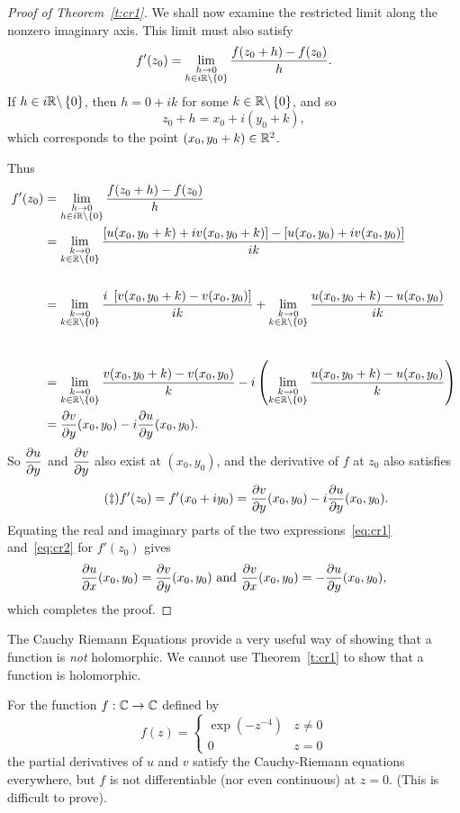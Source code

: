 \begin{proof}[Proof of Theorem~\ref{t:cr1}]
We shall now examine the restricted limit along the nonzero imaginary axis. This limit must also satisfy
\[
f'(z_0) = \displaystyle \lim_{\substack{h\to 0 \\ h \in i \mathbb{R} \backslash \left\{0\right\}}} \frac{f(z_0+h)-f(z_0)}{h}.
\]
If $h \in i \mathbb{R} \backslash \left\{0\right\}$, then $h=0+ik$ for some $k \in \mathbb{R} \backslash \left\{0\right\}$, and so
\[
z_0+h=x_0+i(y_0+k),
\]
which corresponds to the point  $(x_0,y_0+k) \in \mathbb{R}^2$.

Thus
\begin{align*}
f'(z_0) & = \rlim{h \to 0}{h \in i\R \backslash \set{0}} \frac{f(z_0+h)-f(z_0)}{h} \\
& = \rlim{k \to 0}{k \in \R \backslash \set{0}} \frac{\left[ u(x_0,y_0+k)+iv(x_0,y_0+k) \right] - \left[ u(x_0,y_0)+iv(x_0,y_0) \right]}{ik} \\
& \vspace*{2cm} \\
& =   \rlim{k \to 0}{k \in \R \backslash \set{0}} \frac{i\ \left[ v(x_0,y_0+k)-v(x_0,y_0) \right]}{ik} +
 \rlim{k \to 0}{k \in \R \backslash \set{0}} \frac{u(x_0,y_0+k)-u(x_0,y_0)}{ik}     \\[5ex]
 & =   \rlim{k \to 0}{k \in \R \backslash \set{0}} \frac{v(x_0,y_0+k)-v(x_0,y_0)}{k} 
 -i \left( \rlim{k \to 0}{k \in \R \backslash \set{0}} \frac{u(x_0,y_0+k)-u(x_0,y_0)}{k} \right)     \\
 & = \pd{v}{y} (x_0,y_0)-i \pd{u}{y} (x_0,y_0).
\end{align*}
So $\dfrac{\partial u}{\partial y}$ and $\dfrac{\partial v}{\partial y}$ also exist at $(x_0,y_0)$, and the derivative of $f$ at $z_0$ also satisfies
\begin{equation}
\label{eq:cr2}
\tag{$\ddagger$}
f'(z_0) = f'(x_0+iy_0) = \dfrac{\partial v}{\partial y} (x_0,y_0) - i \dfrac{\partial u}{\partial y} (x_0,y_0).
\end{equation}
Equating the real and imaginary parts of the two expressions~\eqref{eq:cr1} and~\eqref{eq:cr2} for $f'(z_0)$ gives
\[
\dfrac{\partial u}{\partial x} (x_0,y_0) = \dfrac{\partial v}{\partial y} (x_0,y_0) \text{ and } \dfrac{\partial v}{\partial x}(x_0,y_0) = - \dfrac{\partial u}{\partial y} (x_0,y_0),
\]
which completes the proof.
\end{proof}
The Cauchy Riemann Equations provide a very useful way of showing that a function is \emph{not} holomorphic.  We cannot use Theorem~\ref{t:cr1} to show that a function is holomorphic.
\begin{example}
For the function $f: \mathbb{C} \to \mathbb{C}$ defined by
\[
f(z) = 
\begin{cases}
\exp(-z^{-4}) & z \neq 0 \\
0 & z=0
\end{cases}
\]
the partial derivatives of $u$ and $v$ satisfy the Cauchy-Riemann equations everywhere, but $f$ is not differentiable (nor even continuous) at $z=0$.  (This is difficult to prove).
\end{example}

